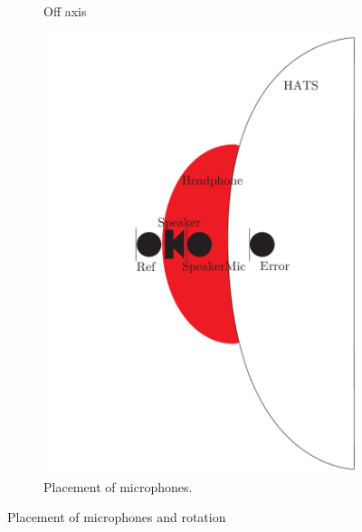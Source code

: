 \begin{figure}[H]
\begin{subfigure}[b]{.4\textwidth}
		\caption{Off axis}
		\label{fig:AngOfIndOffax}
	\end{subfigure} 
	\begin{subfigure}[b]{.4\textwidth}
	\centering
	\includegraphics[width=\textwidth]{../Journal/Experiments/AngleOfIncidence/AngleOfIncidenceSchematic.pdf}
	\caption{Placement of microphones.}
	\label{fig:AngOgIndMicplace}
\end{subfigure}
	\caption{Placement of microphones and rotation}
	\label{fig:AngleOfIndDiagram}
\end{figure}


